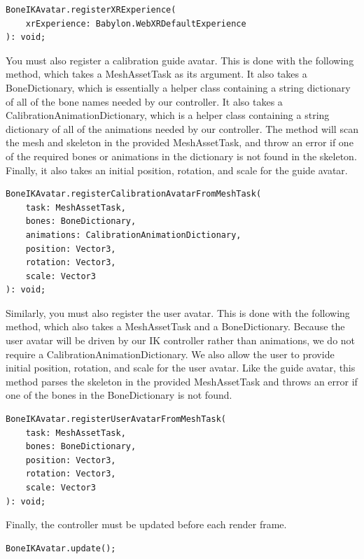 \documentclass{vgtc}                          %
\begin{document}
\begin{verbatim}
BoneIKAvatar.registerXRExperience(
    xrExperience: Babylon.WebXRDefaultExperience
): void;
\end{verbatim}

You must also register a calibration guide avatar. This is done with the following method, which takes a MeshAssetTask as its argument. It also takes a BoneDictionary, which is essentially a helper class containing a string dictionary of all of the bone names needed by our controller. It also takes a CalibrationAnimationDictionary, which is a helper class containing a string dictionary of all of the animations needed by our controller. The method will scan the mesh and skeleton in the provided MeshAssetTask, and throw an error if one of the required bones or animations in the dictionary is not found in the skeleton. Finally, it also takes an initial position, rotation, and scale for the guide avatar.

\begin{verbatim}
BoneIKAvatar.registerCalibrationAvatarFromMeshTask(
    task: MeshAssetTask,
    bones: BoneDictionary,
    animations: CalibrationAnimationDictionary,
    position: Vector3,
    rotation: Vector3,
    scale: Vector3
): void;
\end{verbatim}
    
Similarly, you must also register the user avatar. This is done with the following method, which also takes a MeshAssetTask and a BoneDictionary. Because the user avatar will be driven by our IK controller rather than animations, we do not require a CalibrationAnimationDictionary. We also allow the user to provide initial position, rotation, and scale for the user avatar. Like the guide avatar, this method parses the skeleton in the provided MeshAssetTask and throws an error if one of the bones in the BoneDictionary is not found.

\begin{verbatim}
BoneIKAvatar.registerUserAvatarFromMeshTask(
    task: MeshAssetTask,
    bones: BoneDictionary,
    position: Vector3,
    rotation: Vector3,
    scale: Vector3
): void;
\end{verbatim}

Finally, the controller must be updated before each render frame.

\begin{verbatim}
BoneIKAvatar.update();
\end{verbatim}
    
\end{document}
